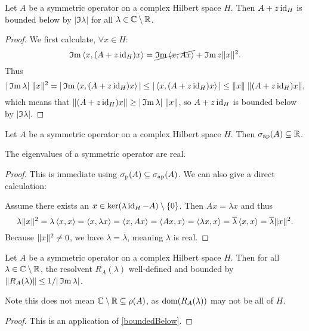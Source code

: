\begin{proposition}
Let $A$ be a symmetric operator on a complex Hilbert space $H$. Then $A + z\operatorname{id}_H$ is bounded below by $|\Im \lambda|$ for all $\lambda \in \mathbb{C}\setminus\mathbb{R}$.
\end{proposition}
\begin{proof}
We first calculate, $\forall x\in H$:
\[ \operatorname{\mathfrak{I}m}\left\langle x, (A+ z\operatorname{id}_H)x \right\rangle = \cancel{\operatorname{\mathfrak{I}m}\left\langle x,Ax \right\rangle} + \operatorname{\mathfrak{I}m} z\lVert x\rVert^2. \]
Thus
\[ |\operatorname{\mathfrak{I}m}\lambda|\;\lVert x\rVert^2 = |\operatorname{\mathfrak{I}m}\left\langle x, (A + z\operatorname{id}_H)x \right\rangle| \leq |\left\langle x, (A + z\operatorname{id}_H)x \right\rangle| \leq \lVert x\rVert\;\lVert(A + z\operatorname{id}_H)x\rVert, \]
which means that $\lVert(A + z\operatorname{id}_H)x\rVert \geq |\operatorname{\mathfrak{I}m}\lambda|\;\lVert x\rVert$, so $A + z\operatorname{id}_H$ is bounded below by $|\Im \lambda|$.
\end{proof}
\begin{corollary} \label{approximateSpectrumSymmetricOperator}
Let $A$ be a symmetric operator on a complex Hilbert space $H$. Then $\sigma_\text{ap}(A) \subseteq \mathbb{R}$.
\end{corollary}
\begin{corollary}
The eigenvalues of a symmetric operator are real.
\end{corollary}
\begin{proof}
This is immediate using $\sigma_\text{p}(A)\subseteq \sigma_\text{ap}(A)$. We can also give a direct calculation:

Assume there exists an $x\in \ker(\lambda\operatorname{id}_H - A)\setminus\{0\}$. Then $Ax = \lambda x$ and thus
\[ \lambda\lVert x\rVert^2 = \lambda\left\langle x,x \right\rangle = \left\langle x, \lambda x \right\rangle = \left\langle x,Ax \right\rangle = \left\langle Ax,x \right\rangle = \left\langle \lambda x, x \right\rangle = \overline{\lambda}\left\langle x,x \right\rangle = \overline{\lambda}\lVert x\rVert^2. \]
Because $\lVert x\rVert^2 \neq 0$, we have $\lambda = \overline{\lambda}$, meaning $\lambda$ is real.
\end{proof}
\begin{corollary} \label{symmetricResolvent}
Let $A$ be a symmetric operator on a complex Hilbert space $H$. Then for all $\lambda\in\mathbb{C}\setminus\mathbb{R}$, the resolvent $R_A(\lambda)$ well-defined and bounded by $\lVert R_A(\lambda)\rVert\leq 1/|\operatorname{\mathfrak{I}m} \lambda|$.
\end{corollary}
Note this does not mean $\mathbb{C}\setminus\mathbb{R}\subseteq \rho(A)$, as $\operatorname{dom}(R_A(\lambda))$ may not be all of $H$.
\begin{proof}
This is an application of \ref{boundedBelow}.
\end{proof}

